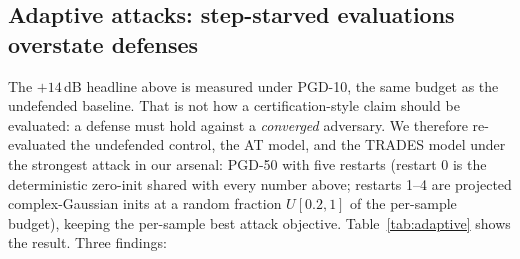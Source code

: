 \documentclass[review]{elsarticle}
\begin{document}
\subsection{Adaptive attacks: step-starved evaluations overstate defenses}
\label{sec:adaptive}

The $+14$\,dB headline above is measured under PGD-10, the same budget as
the undefended baseline. That is not how a certification-style claim should
be evaluated: a defense must hold against a \emph{converged} adversary. We
therefore re-evaluated the undefended control, the AT model, and the TRADES
model under the strongest attack in our arsenal: PGD-50 with five restarts
(restart 0 is the deterministic zero-init shared with every number above;
restarts 1--4 are projected complex-Gaussian inits at a random fraction
$U[0.2,1]$ of the per-sample budget), keeping the per-sample best attack
objective. Table~\ref{tab:adaptive} shows the result. Three findings:
\end{document}
